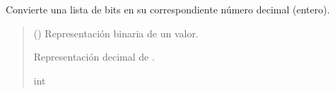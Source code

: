 \documentclass[letterpaper,10pt,english]{sphinxmanual}
\begin{document}
\begin{fulllineitems}
\label{\detokenize{fpga.interfaz_pcps:fpga.interfaz_pcps.bitstr_to_int}}
\pysigstartsignatures
{}
\pysigstopsignatures
\sphinxAtStartPar
Convierte una lista de bits en su correspondiente número decimal (entero).
\begin{quote}\begin{description}
\sphinxAtStartPar
{} (\sphinxstyleliteralemphasis{\sphinxupquote{,}}) \textendash{} Representación binaria de un valor.

\sphinxAtStartPar
Representación decimal de .

\sphinxAtStartPar
int

\end{description}\end{quote}

\end{fulllineitems}

\end{document}
